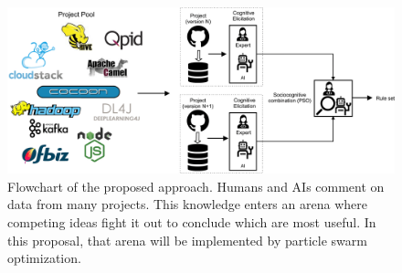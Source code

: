 \begin{figure}[t!]
    \centering
    \includegraphics[width=\linewidth]{figs/flow.png}
    \caption{Flowchart of the proposed approach. Humans and AIs comment on data 
    from many projects. This knowledge enters an arena where competing ideas fight it out
    to conclude which are most useful. In this proposal, that arena will be implemented by particle swarm optimization.}
    \label{fig:flow}
\end{figure}
